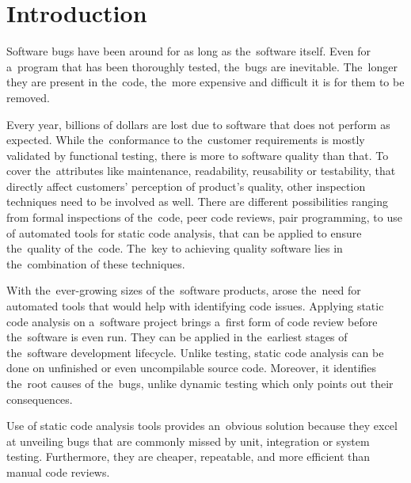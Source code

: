 \documentclass[
  digital, %
  table,   %
  lof,     %
  lot,     %
  oneside,
]{fithesis3}
\begin{document}
\chapter{Introduction}

Software bugs have been around for as long as the~software itself. Even for a~program that has been thoroughly tested, the~bugs are inevitable. The~longer they are present in the~code, the~more expensive and difficult it is for them to be removed. 

Every year, billions of dollars are lost due to software that does not perform as expected. 
While the~conformance to the~customer requirements is mostly validated by functional testing, there is more to software quality than that. To cover the~attributes like maintenance, readability, reusability or testability, that directly affect customers' perception of product's quality, other inspection techniques need to be involved as well. There are different possibilities ranging from formal inspections of the~code, peer code reviews, pair programming, to use of automated tools for static code analysis, that can be applied to ensure the~quality of the~code. The~key to achieving quality software lies in the~combination of these techniques. 

With the~ever-growing sizes of the~software products, arose the~need for automated tools that would help with identifying code issues. Applying static code analysis on a~software project brings a~first form of code review before the~software is even run. They can be applied in the~earliest stages of the~software development lifecycle. Unlike testing, static code analysis can be done on unfinished or even uncompilable source code. Moreover, it identifies the~root causes of the~bugs, unlike dynamic testing which only points out their consequences. 

Use of static code analysis tools provides an~obvious solution because they excel at unveiling bugs that are commonly missed by unit, integration or system testing. Furthermore, they are cheaper, repeatable, and more efficient than manual code reviews. 
\end{document}
